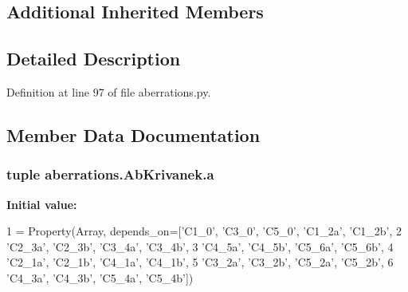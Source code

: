\subsection*{Additional Inherited Members}


\subsection{Detailed Description}


Definition at line 97 of file aberrations.\-py.



\subsection{Member Data Documentation}
\hypertarget{classaberrations_1_1_ab_krivanek_a64acaf45047a7edb58b22723a142d438}{
\subsubsection[{a}]{\setlength{\rightskip}{0pt plus 5cm}tuple aberrations.\-Ab\-Krivanek.\-a\hspace{0.3cm}{\ttfamily [static]}}}\label{classaberrations_1_1_ab_krivanek_a64acaf45047a7edb58b22723a142d438}
{\bfseries Initial value\-:}
\begin{DoxyCode}
1 = Property(Array, depends\_on=[\textcolor{stringliteral}{'C1\_0'}, \textcolor{stringliteral}{'C3\_0'}, \textcolor{stringliteral}{'C5\_0'}, \textcolor{stringliteral}{'C1\_2a'}, \textcolor{stringliteral}{'C1\_2b'}, 
2                                     \textcolor{stringliteral}{'C2\_3a'}, \textcolor{stringliteral}{'C2\_3b'}, \textcolor{stringliteral}{'C3\_4a'}, \textcolor{stringliteral}{'C3\_4b'},
3                                     \textcolor{stringliteral}{'C4\_5a'}, \textcolor{stringliteral}{'C4\_5b'}, \textcolor{stringliteral}{'C5\_6a'}, \textcolor{stringliteral}{'C5\_6b'},
4                                     \textcolor{stringliteral}{'C2\_1a'}, \textcolor{stringliteral}{'C2\_1b'}, \textcolor{stringliteral}{'C4\_1a'}, \textcolor{stringliteral}{'C4\_1b'},
5                                     \textcolor{stringliteral}{'C3\_2a'}, \textcolor{stringliteral}{'C3\_2b'}, \textcolor{stringliteral}{'C5\_2a'}, \textcolor{stringliteral}{'C5\_2b'},
6                                     \textcolor{stringliteral}{'C4\_3a'}, \textcolor{stringliteral}{'C4\_3b'}, \textcolor{stringliteral}{'C5\_4a'}, \textcolor{stringliteral}{'C5\_4b'}])
\end{DoxyCode}


